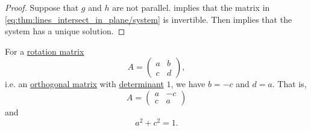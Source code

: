 \begin{proof}
  \UniquenessSubProof Suppose that \( g \) and \( h \) are not parallel.  implies that the matrix in \eqref{eq:thm:lines_intersect_in_plane/system} is invertible. Then  implies that the system has a unique solution.
\end{proof}

\begin{proposition}\label{thm:rotation_matrix_symmetry}
  For a \hyperref[def:rigid_motion/rotation]{rotation matrix}
  \begin{equation*}
    A = \begin{pmatrix}
      a & b \\
      c & d
    \end{pmatrix},
  \end{equation*}
  i.e. an \hyperref[def:unitary_matrix]{orthogonal matrix} with \hyperref[def:matrix_determinant]{determinant} \( 1 \), we have \( b = -c \) and \( d = a \). That is,
  \begin{equation*}
    A = \begin{pmatrix}
      a & -c \\
      c & a
    \end{pmatrix}
  \end{equation*}
  and
  \begin{equation*}
    a^2 + c^2 = 1.
  \end{equation*}
\end{proposition}
